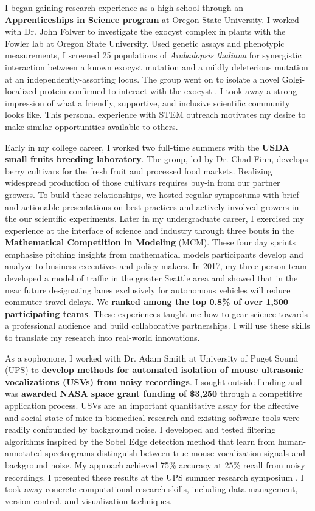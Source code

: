 \noindent
\underline{}
I began gaining research experience as a high school through an \textbf{Apprenticeships in Science program} at Oregon State University.
I worked with Dr. John Folwer to investigate the exocyst complex in plants with the Fowler lab at Oregon State University.
Used genetic assays and phenotypic measurements, I screened 25 populations of \textit{Arabadopsis thaliana} for synergistic interaction between a known exocyst mutation and a mildly deleterious mutation at an independently-assorting locus.
The group went on to isolate a novel Golgi-localized protein confirmed to interact with the exocyst \cite{fowler}.
I took away a strong impression of what a friendly, supportive, and inclusive scientific community looks like.
This personal experience with STEM outreach motivates my desire to make similar opportunities available to others.

Early in my college career, I worked two full-time summers with the \textbf{USDA small fruits breeding laboratory}.
The group, led by Dr. Chad Finn, develops berry cultivars for the fresh fruit and processed food markets.
Realizing widespread production of those cultivars requires buy-in from our partner growers.
To build these relationships, we hosted regular symposiums with brief and actionable presentations on best practices and actively involved growers in the our scientific experiments.
Later in my undergraduate career, I exercised my experience at the interface of science and industry through three bouts in the \textbf{Mathematical Competition in Modeling} (MCM).
These four day sprints emphasize pitching insights from mathematical models participants develop and analyze to business executives and policy makers.
In 2017, my three-person team developed a model of traffic in the greater Seattle area and showed that in the near future designating lanes exclusively for autonomous vehicles will reduce commuter travel delays.
We \textbf{ranked among the top 0.8\% of over 1,500 participating teams}.
These experiences taught me how to gear science towards a professional audience and build collaborative partnerships.
I will use these skills to translate my research into real-world innovations.

As a sophomore, I worked with Dr. Adam Smith at University of Puget Sound (UPS) to \textbf{develop methods for automated isolation of mouse
ultrasonic vocalizations (USVs) from noisy recordings}.
I sought outside funding and was \textbf{awarded NASA space grant funding of \$3,250} through a competitive application process.
USVs are an important quantitative assay for the affective and social state of mice in biomedical research and existing software tools were readily confounded by background noise.
I developed and tested filtering algorithms inspired by the Sobel Edge detection method that learn from human-annotated spectrograms distinguish between true mouse vocalization signals and background noise.
My approach achieved 75\% accuracy at 25\% recall from noisy recordings.
I presented these results at the UPS summer research symposium \cite{smith}.
I took away concrete computational research skills, including data management, version control, and visualization techniques.

